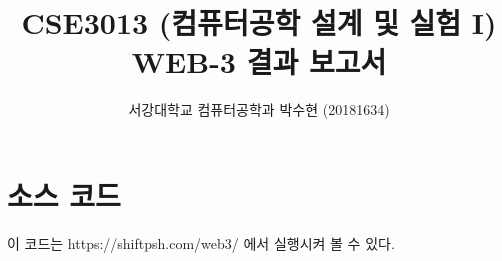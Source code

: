 
	


\title{CSE3013 (컴퓨터공학 설계 및 실험 I) \space \newline WEB-3 결과 보고서}
\author{서강대학교 컴퓨터공학과 박수현 (20181634)}
\maketitle

\section{소스 코드}
이 코드는 https://shiftpsh.com/web3/ 에서 실행시켜 볼 수 있다.

\inputminted[xleftmargin=\parindent,breaklines,linenos]{html}{inc-sources/source-web3.html}
  

